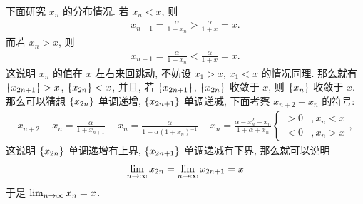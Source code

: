 \begin{exercise}[resume=exer]
\begin{answer}
      下面研究 $ x_{n} $ 的分布情况. 若 $ x_{n} < x $, 则
      \begin{align*}
          x_{n + 1} = \frac{\alpha}{1 + x_{n}} > \frac{\alpha}{1 + x} = x.
      \end{align*}
      而若 $ x_{n} > x $, 则
      \begin{align*}
          x_{n + 1} = \frac{\alpha}{1 + x_{n}} < \frac{\alpha}{1 + x} = x.
      \end{align*}
      这说明 $ x_{n} $ 的值在 $ x $ 左右来回跳动, 不妨设 $ x_{1} > x $, $ x_{1} < x $ 的情况同理. 那么就有 $ \qty{x_{2n + 1}} > x $, $ \qty{x_{2n}} < x $, 并且, 若 $ \qty{x_{2n + 1}} $, $ \qty{x_{2n}} $ 收敛于 $ x $, 则 $ \qty{x_{n}} $ 收敛于 $ x $.
      那么可以猜想 $ \qty{x_{2n}} $ 单调递增, $ \qty{x_{2n + 1}} $ 单调递减, 下面考察 $ x_{n + 2} - x_{n} $ 的符号:
      \begin{align*}
          x_{n + 2} - x_{n} = \frac{\alpha}{1 + x_{n + 1}} - x_{n} = \frac{\alpha}{1 + \alpha(1 + x_{n})^{-1}} - x_{n} = \frac{\alpha - x_{n}^{2} - x_{n}}{1 + \alpha + x_{n}}
          \begin{cases}
              > 0 & , x_{n} < x\\
              < 0 & , x_{n} > x
          \end{cases},
      \end{align*}
      这说明 $ \qty{x_{2n}} $ 单调递增有上界, $ \qty{x_{2n + 1}} $ 单调递减有下界, 那么就可以说明
      \begin{align*}
          \lim_{n \to \infty}x_{2n} = \lim_{n \to \infty}x_{2n + 1} = x
      \end{align*}
      于是 $ \lim_{n \to \infty}x_{n} = x $.
  \end{answer}
\end{exercise}
\stopexercise